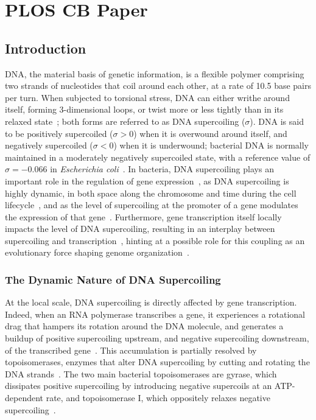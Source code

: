 \chapter{PLOS CB Paper}

\section{Introduction}

DNA, the material basis of genetic information, is a flexible polymer comprising two strands of nucleotides that coil around each other, at a rate of 10.5 base pairs per turn.
When subjected to torsional stress, DNA can either writhe around itself, forming 3-dimensional loops, or twist more or less tightly than in its relaxed state~\citep{krogh2018}; both forms are referred to as DNA supercoiling ($\sigma$).
DNA is said to be positively supercoiled ($\sigma > 0$) when it is overwound around itself, and negatively supercoiled ($\sigma < 0$) when it is underwound; bacterial DNA is normally maintained in a moderately negatively supercoiled state, with a reference value of $\sigma=-0.066$ in \emph{Escherichia coli}~\citep{crozat2005}.
In bacteria, DNA supercoiling plays an important role in the regulation of gene expression~\citep{martisb.2019}, as DNA supercoiling is highly dynamic, in both space along the chromosome and time during the cell lifecycle~\citep{krogh2018}, and as the level of supercoiling at the promoter of a gene modulates the expression of that gene~\citep{forquet2021}.
Furthermore, gene transcription itself locally impacts the level of DNA supercoiling, resulting in an interplay between supercoiling and transcription~\citep{dorman2019}, hinting at a possible role for this coupling as an evolutionary force shaping genome organization~\citep{junier2016}.

\subsection{The Dynamic Nature of DNA Supercoiling}

At the local scale, DNA supercoiling is directly affected by gene transcription.
Indeed, when an RNA polymerase transcribes a gene, it experiences a rotational drag that hampers its rotation around the DNA molecule, and generates a buildup of positive supercoiling upstream, and negative supercoiling downstream, of the transcribed gene~\citep{liu1987,ma2016}.
This accumulation is partially resolved by topoisomerases, enzymes that alter DNA supercoiling by cutting and rotating the DNA strands~\citep*{duprey2021}.
The two main bacterial topoisomerases are gyrase, which dissipates positive supercoiling by introducing negative supercoils at an ATP-dependent rate, and topoisomerase I, which oppositely relaxes negative supercoiling~\citep{martisb.2019}.

